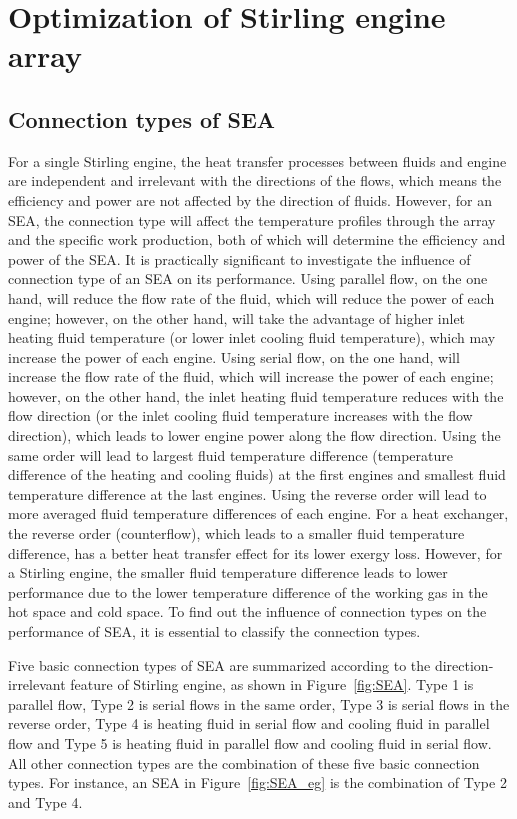 \chapter{Optimization of Stirling engine array}

\section{Connection types of SEA}
\label{sec:connectionTypes}
For a single Stirling engine, the heat transfer processes between fluids and engine are independent and irrelevant with the directions of the flows, which means the efficiency and power are not affected by the direction of fluids. However, for an SEA, the connection type will affect the temperature profiles through the array and the specific work production, both of which will determine the efficiency and power of the SEA. It is practically significant to investigate the influence of connection type of an SEA on its performance. Using parallel flow, on the one hand, will reduce the flow rate of the fluid, which will reduce the power of each engine; however, on the other hand, will take the advantage of higher inlet heating fluid temperature (or lower inlet cooling fluid temperature), which may increase the power of each engine. Using serial flow, on the one hand, will increase the flow rate of the fluid, which will increase the power of each engine; however, on the other hand, the inlet heating fluid temperature reduces with the flow direction (or the inlet cooling fluid temperature increases with the flow direction), which leads to lower engine power along the flow direction. Using the same order will lead to largest fluid temperature difference (temperature difference of the heating and cooling fluids) at the first engines and smallest fluid temperature difference at the last engines. Using the reverse order will lead to more averaged fluid temperature differences of each engine. For a heat exchanger, the reverse order (counterflow), which leads to a smaller fluid temperature difference, has a better heat transfer effect for its lower exergy loss. However, for a Stirling engine, the smaller fluid temperature difference leads to lower performance due to the lower temperature difference of the working gas in the hot space and cold space. To find out the influence of connection types on the performance of SEA, it is essential to classify the connection types.

Five basic connection types of SEA are summarized according to the direction-irrelevant feature of Stirling engine, as shown in Figure~\ref{fig:SEA}. Type 1 is parallel flow, Type 2 is serial flows in the same order, Type 3 is serial flows in the reverse order, Type 4 is heating fluid in serial flow and cooling fluid in parallel flow and Type 5 is heating fluid in parallel flow and cooling fluid in serial flow. All other connection types are the combination of these five basic connection types. For instance, an SEA in Figure~\ref{fig:SEA_eg} is the combination of Type 2 and Type 4. 


